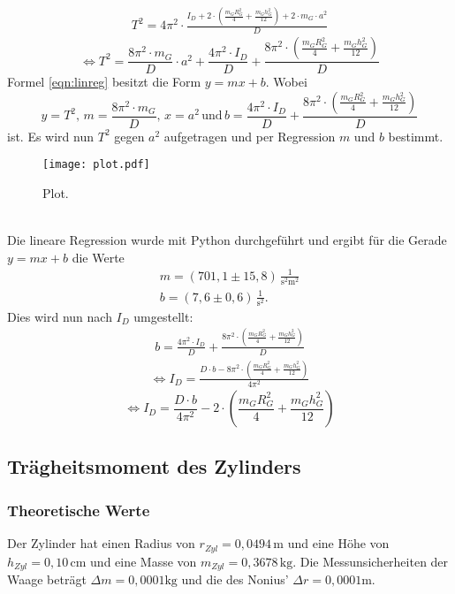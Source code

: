 \begin{align*}
  T^2 = 4\pi^2 \cdot \frac{I_D + 2 \cdot \left(\frac{m_G R_G^2}{4} + \frac{m_G h_G^2}{12} \right) + 2 \cdot m_G \cdot a^2}{D}
\end{align*}
\begin{equation}
  \label{eqn:linreg}
  \Leftrightarrow T^2 = \frac{8\pi^2 \cdot m_G}{D}\cdot a^2 + \frac{4\pi^2 \cdot I_D}{D}  + \frac{8\pi^2 \cdot \left(\frac{m_G R_G^2}{4} + \frac{m_G h_G^2}{12} \right)}{D}
\end{equation}
Formel \ref{eqn:linreg} besitzt die Form $y = mx + b$. Wobei 
\begin{equation*}
  y = T^2,\, m = \frac{8\pi^2 \cdot m_G}{D},\, x = a^2 \, \mathrm{und}\, b = \frac{4\pi^2 \cdot I_D}{D}  + \frac{8\pi^2 \cdot \left(\frac{m_G R_G^2}{4} + \frac{m_G h_G^2}{12} \right)}{D}
\end{equation*}
ist. Es wird nun $T^2$ gegen $a^2$ aufgetragen und per Regression $m$ und $b$ bestimmt. 
 \begin{figure}
   \centering
   \texttt{[image: plot.pdf]}
   \caption{Plot.}
   \label{fig:plot}
 \end{figure}
\\
Die lineare Regression wurde mit Python durchgeführt und ergibt für die Gerade $y = mx + b$ die Werte
\begin{align*}
  m = (701{,}1 \pm 15{,}8)\, \frac{1}{\mathrm{s^2 m^2}} \\
  b = (7{,}6 \pm 0{,}6)\, \frac{1}{\mathrm{s^2}} .
\end{align*}
Dies wird nun nach $I_D$ umgestellt:
\begin{align*}
  b = \frac{4\pi^2 \cdot I_D}{D}  + \frac{8\pi^2 \cdot \left(\frac{m_G R_G^2}{4} + \frac{m_G h_G^2}{12} \right)}{D}
\end{align*}
\begin{align*}
  \Leftrightarrow I_D = \frac{D \cdot b - 8\pi^2 \cdot \left(\frac{m_G R_G^2}{4} + \frac{m_G h_G^2}{12} \right)}{4\pi^2}
\end{align*}
\begin{equation}
  \Leftrightarrow I_D = \frac{D \cdot b}{4\pi^2} - 2 \cdot \left(\frac{m_G R_G^2}{4} + \frac{m_G h_G^2}{12} \right)
\end{equation}

\subsection{Trägheitsmoment des Zylinders}
\label{sec:TraegheitsmomentdesZylinders}
\subsubsection{Theoretische Werte}
Der Zylinder hat einen Radius von $r_{Zyl} = 0{,}0494 \, \mathrm{m}$ und eine Höhe von $h_{Zyl} = 0{,}10 \, \mathrm{cm}$
und eine Masse von $m_{Zyl} = 0{,}3678 \, \mathrm{kg}$.
Die Messunsicherheiten der Waage beträgt $\Delta m = 0,0001 \mathrm{kg}$ und die des Nonius' $\Delta r = 0,0001 \mathrm{m}$.



